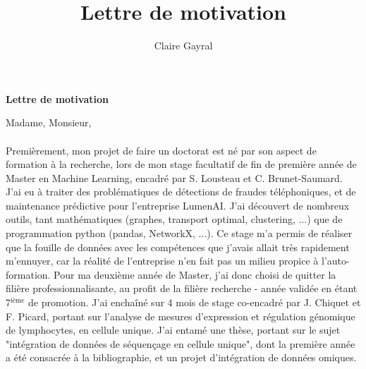 \documentclass[a4paper,11pt]{article}
\title{Lettre de motivation}
\author{Claire Gayral}
\date{}
\begin{document}
{\centering \Large \bf Lettre de motivation \\ \vspace{0.6cm} }

Madame, Monsieur,\\


\\

Premièrement, mon projet de faire un doctorat est né par son aspect de formation à la recherche, lors de mon stage facultatif de fin de première année de Master en Machine Learning, encadré par S. Lousteau et C. Brunet-Saumard.
J'ai eu à traiter des problématiques de détections de fraudes téléphoniques, et de maintenance prédictive pour l'entreprise LumenAI. J'ai découvert de nombreux outils, tant mathématiques (graphes, transport optimal, clustering, ...) que de programmation python (pandas, NetworkX, ...). 
Ce stage m'a permis de réaliser que la fouille de données avec les compétences que j'avais allait très rapidement m'ennuyer, car la réalité de l'entreprise n'en fait pas un milieu propice à l'auto-formation. 
Pour ma deuxième année de Master, j'ai donc choisi de quitter la filière professionnalisante, au profit de la filière recherche - année validée en étant 7$^{\text{ième}}$ de promotion. 
J'ai enchaîné sur 4 mois de stage co-encadré par J. Chiquet et F. Picard, portant sur l'analyse de mesures d'expression et régulation génomique de lymphocytes, en cellule unique. %
%
%
J'ai entamé une thèse, portant sur le sujet "intégration de données de séquençage en cellule unique", dont la première année a été consacrée à la bibliographie, et un projet d'intégration de données omiques. 
\end{document}
